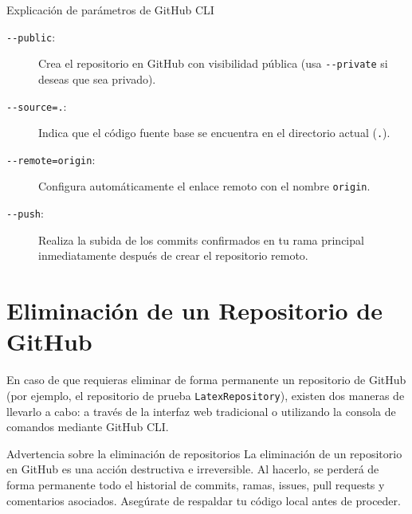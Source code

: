 \documentclass[
10pt, %
a4paper, %
oneside, %
headinclude,footinclude, %
BCOR5mm, %
]{scrartcl}
\begin{document}
\begin{InfoBox}{Explicación de parámetros de GitHub CLI}
	\begin{description}
		\item[\texttt{-{}-public}:] Crea el repositorio en GitHub con visibilidad pública (usa \texttt{-{}-private} si deseas que sea privado).
		\item[\texttt{-{}-source=.}:] Indica que el código fuente base se encuentra en el directorio actual (\texttt{.}).
		\item[\texttt{-{}-remote=origin}:] Configura automáticamente el enlace remoto con el nombre \texttt{origin}.
		\item[\texttt{-{}-push}:] Realiza la subida de los commits confirmados en tu rama principal inmediatamente después de crear el repositorio remoto.
	\end{description}
\end{InfoBox}

\newpage
\section{Eliminación de un Repositorio de GitHub}

En caso de que requieras eliminar de forma permanente un repositorio de GitHub (por ejemplo, el repositorio de prueba \texttt{LatexRepository}), existen dos maneras de llevarlo a cabo: a través de la interfaz web tradicional o utilizando la consola de comandos mediante GitHub CLI.

\begin{WarningBox}{Advertencia sobre la eliminación de repositorios}
	La eliminación de un repositorio en GitHub es una acción destructiva e irreversible. Al hacerlo, se perderá de forma permanente todo el historial de commits, ramas, issues, pull requests y comentarios asociados. Asegúrate de respaldar tu código local antes de proceder.
\end{WarningBox}
\end{document}
